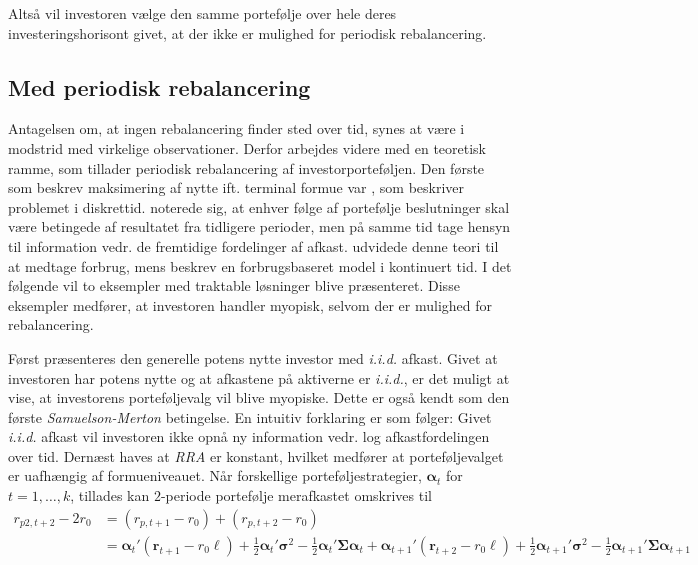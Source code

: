 \documentclass[
  a4paper,
  oneside]{memoir}
\begin{document}
Altså vil investoren vælge den samme portefølje over hele deres investeringshorisont givet, at der ikke er mulighed for periodisk rebalancering.

\hypertarget{medperireb}{%
\subsection{Med periodisk rebalancering}\label{medperireb}}

Antagelsen om, at ingen rebalancering finder sted over tid, synes at være i modstrid med virkelige observationer. Derfor arbejdes videre med en teoretisk ramme, som tillader periodisk rebalancering af investorporteføljen. Den første som beskrev maksimering af nytte ift. terminal formue var \citep{Mossin1968}, som beskriver problemet i diskrettid. \citep{Mossin1968} noterede sig, at enhver følge af portefølje beslutninger skal være betingede af resultatet fra tidligere perioder, men på samme tid tage hensyn til information vedr. de fremtidige fordelinger af afkast. \citep{Samuelson1969} udvidede denne teori til at medtage forbrug, mens \citep{Merton1969, Merton1971} beskrev en forbrugsbaseret model i kontinuert tid. I det følgende vil to eksempler med traktable løsninger blive præsenteret. Disse eksempler medfører, at investoren handler myopisk, selvom der er mulighed for rebalancering.

Først præsenteres den generelle potens nytte investor med \emph{i.i.d.} afkast. Givet at investoren har potens nytte og at afkastene på aktiverne er \emph{i.i.d.}, er det muligt at vise, at investorens porteføljevalg vil blive myopiske. Dette er også kendt som den første \emph{Samuelson-Merton} betingelse. En intuitiv forklaring er som følger: Givet \emph{i.i.d.} afkast vil investoren ikke opnå ny information vedr. log afkastfordelingen over tid. Dernæst haves at \emph{RRA} er konstant, hvilket medfører at porteføljevalget er uafhængig af formueniveauet. Når forskellige porteføljestrategier, \(\bm{\alpha}_t\) for \(t=1,\dots,k\), tillades kan \(2\)-periode portefølje merafkastet omskrives til
\begin{align*}
r_{p2,t+2}-2r_0&=(r_{p,t+1}-r_0)+(r_{p,t+2}-r_0)\\
&= \bm{\alpha}_t'(\bm{r}_{t+1}-r_0\bm{\ell})+\frac{1}{2}\bm{\alpha}_t'\bm{\sigma}^2-\frac{1}{2} \bm{\alpha}_t'\bm{\Sigma}\bm{\alpha}_t + \bm{\alpha}_{t+1}'(\bm{r}_{t+2}-r_0\bm{\ell})+\frac{1}{2}\bm{\alpha}_{t+1}'\bm{\sigma}^2-\frac{1}{2} \bm{\alpha}_{t+1}'\bm{\Sigma}\bm{\alpha}_{t+1}
\end{align*}
\end{document}
